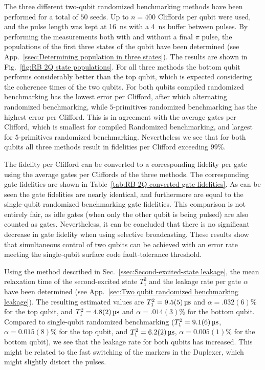           The three different two-qubit randomized benchmarking methods have been performed for a total of $50$ seeds. Up to $n=400$ Cliffords per qubit were used, and the pulse length was kept at \SI{16}{\nano \second} with a \SI{4}{\nano \second} buffer between pulses. By performing the measurements both with and without a final $\pi$ pulse, the populations of the first three states of the qubit have been determined (see App.~\ref{ssec:Determining population in three states}). The results are shown in Fig.~\ref{fig:RB 2Q state populations}. For all three methods the bottom qubit performs considerably better than the top qubit, which is expected considering the coherence times of the two qubits. For both qubits compiled randomized benchmarking has the lowest error per Clifford, after which alternating randomized benchmarking, while $5$-primitives randomized benchmarking has the highest error per Clifford. This is in agreement with the average gates per Clifford, which is smallest for compiled Randomized benchmarking, and largest for $5$-primitives randomized benchmarking. Nevertheless we see that for both qubits all three methods result in fidelities per Clifford exceeding $99\%$.

          The fidelity per Clifford can be converted to a corresponding fidelity per gate using the average gates per Cliffords of the three methods. The corresponding gate fidelities are shown in Table~\ref{tab:RB 2Q converted gate fidelities}. As can be seen the gate fidelities are nearly identical, and furthermore are equal to the single-qubit randomized benchmarking gate fidelities. This comparison is not entirely fair, as idle gates (when only the other qubit is being pulsed) are also counted as gates. Nevertheless, it can be concluded that there is no significant decrease in gate fidelity when using selective broadcasting. These results show that simultaneous control of two qubits can be achieved with an error rate meeting the single-qubit surface code fault-tolerance threshold.

          Using the method described in Sec.~\ref{ssec:Second-excited-state leakage}, the mean relaxation time of the second-excited state $T_1^2$ and the leakage rate per gate $\alpha$ have been determined (see App.~\ref{sec:Two qubit randomized benchmarking leakage}). The resulting estimated values are $T_1^2=\SIm{9.5(5)}{\micro \second}$ and $\alpha=.032(6)\%$ for the top qubit, and $T_1^2=\SIm{4.8(2)}{\micro \second}$ and $\alpha=.014(3)\%$ for the bottom qubit. Compared to single-qubit randomized benchmarking ($T_1^2=\SIm{9.1(6)}{\micro \second}$, $\alpha=0.015(8)\%$ for the top qubit, and $T_1^2=\SIm{6.2(2)}{\micro \second}$, $\alpha=0.005(1)\%$ for the bottom qubit), we see that the leakage rate for both qubits has increased. This might be related to the fast switching of the markers in the Duplexer, which might slightly distort the pulses.

